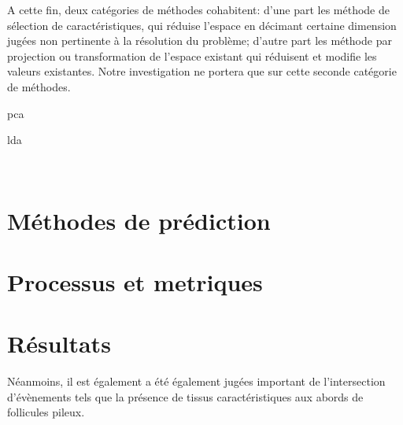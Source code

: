 A cette fin, deux catégories de méthodes cohabitent: d'une part les méthode de sélection de caractéristiques, qui réduise l'espace en décimant certaine dimension jugées non pertinente à la résolution du problème; d'autre part les méthode par projection ou transformation de l'espace existant qui réduisent et modifie les valeurs existantes. Notre investigation ne portera que sur cette seconde catégorie de méthodes.\par

pca\par
lda\par~\cite{Nanni2017}


\section{Méthodes de prédiction}

\section{Processus et metriques}
\section{Résultats}


Néanmoins, il est également a été également jugées important de l'intersection d'évènements tels que la présence de tissus caractéristiques aux abords de follicules pileux.\par